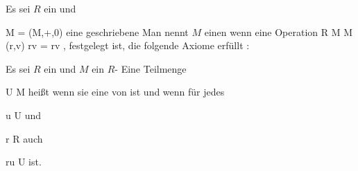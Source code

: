 {}
{




Es sei $R$ ein
und

\mavergleichskette
{\vergleichskette
{ M
}
{ = }{ (M,+,0)
}
{  }{
}
{    }{
}
{   }{
}
}
{}{}{}
eine  {} geschriebene
Man nennt $M$ einen
wenn eine Operation
\maabbeledisp {} {R \times M } { M
} {(r,v)} { rv = r\cdot v
} {,}
 {} {}
festgelegt ist, die folgende Axiome erfüllt
 {} {:}




}



{}
{




Es sei $R$ ein
und $M$ ein
$R$-
Eine Teilmenge

\mavergleichskette
{\vergleichskette
{U
}
{ \subseteq }{ M
}
{  }{
}
{    }{
}
{   }{
}
}
{}{}{}
heißt
wenn sie eine
von
 ist und wenn für jedes

\mavergleichskette
{\vergleichskette
{ u
}
{ \in }{ U
}
{  }{
}
{    }{
}
{   }{
}
}
{}{}{}
und

\mavergleichskette
{\vergleichskette
{ r
}
{ \in }{ R
}
{  }{
}
{    }{
}
{   }{
}
}
{}{}{}
auch

\mavergleichskette
{\vergleichskette
{ ru
}
{ \in }{ U
}
{  }{
}
{    }{
}
{   }{
}
}
{}{}{}
ist.




}



